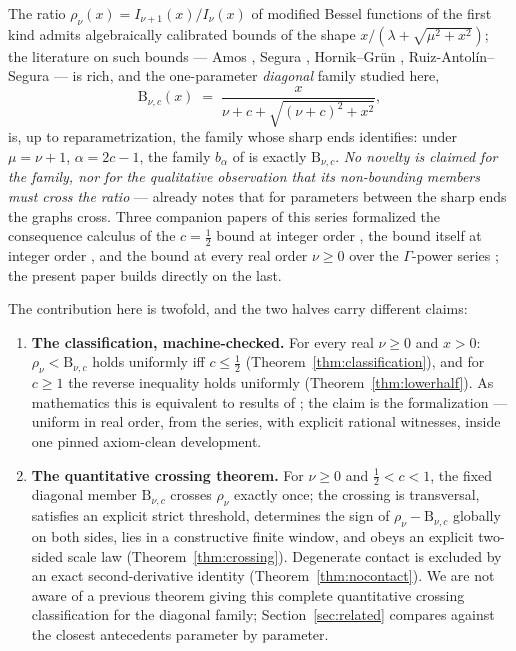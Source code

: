 \documentclass[11pt]{article}
\newcommand{\Bfam}{\mathrm{B}}
\begin{document}
The ratio $\rho_\nu(x) = I_{\nu+1}(x)/I_\nu(x)$ of modified Bessel
functions of the first kind admits algebraically calibrated bounds
of the shape $x/(\lambda+\sqrt{\mu^2+x^2})$; the literature on such
bounds --- Amos \cite{Amos74}, Segura
\cite{Segura11,Segura21,Segura23}, Hornik--Gr\"un \cite{HG13,HG24},
Ruiz-Antol\'in--Segura \cite{RS16} --- is rich, and the
one-parameter \emph{diagonal} family studied here,
\[
\Bfam_{\nu,c}(x) \;=\; \frac{x}{\nu+c+\sqrt{(\nu+c)^2+x^2}},
\]
is, up to reparametrization, the family whose sharp ends
\cite{RS16} identifies: under $\mu = \nu+1$, $\alpha = 2c-1$, the
family $b_\alpha$ of \cite{RS16} is exactly $\Bfam_{\nu,c}$.
\emph{No novelty is claimed for the family, nor for the qualitative
observation that its non-bounding members must cross the ratio}
--- \cite{RS16} already notes that for parameters between the sharp
ends the graphs cross.  Three companion papers of this series
formalized the consequence calculus of the $c=\tfrac12$ bound at
integer order \cite{ErikssonC2}, the bound itself at integer order
\cite{ErikssonC3}, and the bound at every real order $\nu \ge 0$
over the $\Gamma$-power series \cite{ErikssonC4}; the present paper
builds directly on the last.

The contribution here is twofold, and the two halves carry
different claims:
\begin{enumerate}
\item \textbf{The classification, machine-checked.}  For every real
$\nu \ge 0$ and $x > 0$: $\rho_\nu < \Bfam_{\nu,c}$ holds uniformly
iff $c \le \tfrac12$ (Theorem~\ref{thm:classification}), and for
$c \ge 1$ the reverse inequality holds uniformly
(Theorem~\ref{thm:lowerhalf}).  As mathematics this is equivalent
to results of \cite{RS16}; the claim is the formalization ---
uniform in real order, from the series, with explicit rational
witnesses, inside one pinned axiom-clean development.
\item \textbf{The quantitative crossing theorem.}  For $\nu \ge 0$
and $\tfrac12 < c < 1$, the fixed diagonal member $\Bfam_{\nu,c}$
crosses $\rho_\nu$ exactly once; the crossing is transversal,
satisfies an explicit strict threshold, determines the sign of
$\rho_\nu - \Bfam_{\nu,c}$ globally on both sides, lies in a
constructive finite window, and obeys an explicit two-sided scale
law (Theorem~\ref{thm:crossing}).  Degenerate contact is excluded
by an exact second-derivative identity
(Theorem~\ref{thm:nocontact}).  We are not aware of a previous
theorem giving this complete quantitative crossing classification
for the diagonal family; Section~\ref{sec:related} compares against
the closest antecedents parameter by parameter.
\end{enumerate}
\end{document}
